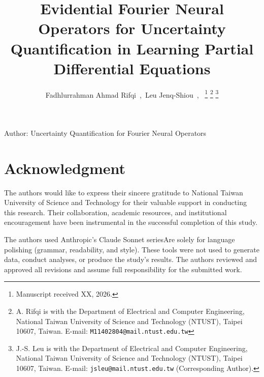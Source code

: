 \documentclass[journal]{IEEEtran}
\begin{document}
\title{Evidential Fourier Neural Operators for Uncertainty Quantification in Learning Partial Differential Equations}

\author{Fadhlurrahman Ahmad Rifqi~,~Leu Jenq-Shiou~,~
\thanks{Manuscript received XX, 2026.}
\thanks{A. Rifqi is with the Department of Electrical and Computer Engineering, National Taiwan University of Science and Technology (NTUST), Taipei 10607, Taiwan. E-mail: \texttt{M11402804@mail.ntust.edu.tw}}
\thanks{J.-S. Leu is with the Department of Electrical and Computer Engineering, National Taiwan University of Science and Technology (NTUST), Taipei 10607, Taiwan. E-mail: \texttt{jsleu@mail.ntust.edu.tw} (Corresponding Author).}}

%
{Author: Uncertainty Quantification for Fourier Neural Operators}

\maketitle

\section*{Acknowledgment}
The authors would like to express their sincere gratitude to National Taiwan University of Science and Technology for their valuable support in conducting this research. Their collaboration, academic resources, and institutional encouragement have been instrumental in the successful completion of this study.

The authors used Anthropic's Claude Sonnet seriesAre solely for language polishing (grammar, readability, and style). These tools were not used to generate data, conduct analyses, or produce the study's results. The authors reviewed and approved all revisions and assume full responsibility for the submitted work.
\end{document}
